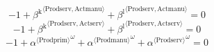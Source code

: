 \begin{equation}
-1 + {\beta^{\mathrm{k}}}^{\langle \mathrm{\mathrm{Prodserv}},\mathrm{\mathrm{Actmanu}}\rangle} + {\beta^{\mathrm{l}}}^{\langle \mathrm{\mathrm{Prodserv}},\mathrm{\mathrm{Actmanu}}\rangle} = 0
\end{equation}
\begin{equation}
-1 + {\beta^{\mathrm{k}}}^{\langle \mathrm{\mathrm{Prodserv}},\mathrm{\mathrm{Actserv}}\rangle} + {\beta^{\mathrm{l}}}^{\langle \mathrm{\mathrm{Prodserv}},\mathrm{\mathrm{Actserv}}\rangle} = 0
\end{equation}
\begin{equation}
-1 + {{\alpha}^{\langle \mathrm{\mathrm{Prodprim}}\rangle}}^{\omega} + {{\alpha}^{\langle \mathrm{\mathrm{Prodmanu}}\rangle}}^{\omega} + {{\alpha}^{\langle \mathrm{\mathrm{Prodserv}}\rangle}}^{\omega} = 0
\end{equation}





